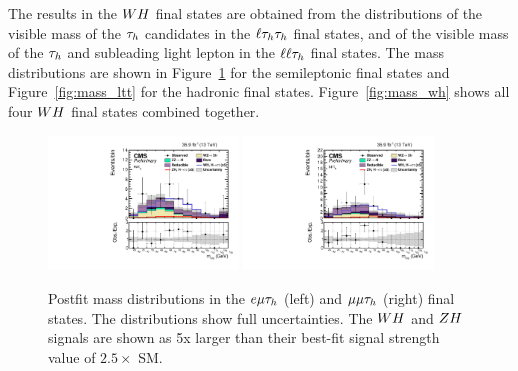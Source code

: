 The results in the $WH$ final states are obtained from the distributions of the 
visible mass of the $\tau_{h}$ candidates in the $\ell\tau_{h}\tau_{h}$ final states, 
and of the visible mass of the $\tau_{h}$ and subleading light lepton in the 
$\ell\ell\tau_{h}$ final states. The mass distributions
are shown in Figure~\ref{fig:mass_llt} for the semileptonic final states 
and Figure~\ref{fig:mass_ltt} for the hadronic final states. 
Figure~\ref{fig:mass_wh} shows all four $WH$ final states combined together.

\begin{figure}[h!]
 \begin{center}
  \includegraphics[width=0.45\textwidth]{higgs_to_taus_vh/plots/wh/emt_postfit.pdf}
  \includegraphics[width=0.45\textwidth]{higgs_to_taus_vh/plots/wh/mmt_postfit.pdf}
 \end{center}
 \caption{Postfit mass distributions in the $e\mu\tau_{h}$ (left) and 
 $\mu\mu\tau_{h}$ (right) final states.
 The distributions show full uncertainties.
 The $WH$ and $ZH$ signals are shown as 5x larger than their best-fit
 signal strength value of $2.5 \times$ SM.
 }
 \label{fig:mass_llt}
\end{figure}

